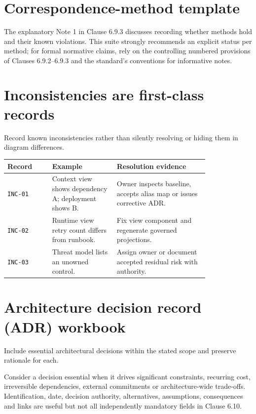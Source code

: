 \documentclass[11pt,letterpaper]{article}
\begin{document}
\section{Correspondence-method template}
\begin{Guidance}The explanatory Note 1 in Clause 6.9.3 discusses recording whether methods hold and their known violations. This suite strongly recommends an explicit status per method; for formal normative claims, rely on the controlling numbered provisions of Clauses 6.9.2--6.9.3 and the standard's conventions for informative notes.\end{Guidance}
\section{Inconsistencies are first-class records}
\begin{Requirement}\FlagReq{} Record known inconsistencies rather than silently resolving or hiding them in diagram differences. \end{Requirement}
\begin{longtable}{p{0.18\linewidth}p{0.26\linewidth}p{0.37\linewidth}}\toprule\textbf{Record}&\textbf{Example}&\textbf{Resolution evidence}\\\midrule\endhead
\texttt{INC-01}&Context view shows dependency A; deployment shows B.&Owner inspects baseline, accepts alias map or issues corrective ADR.\\
\texttt{INC-02}&Runtime view retry count differs from runbook.&Fix view component and regenerate governed projections.\\
\texttt{INC-03}&Threat model lists an unowned control.&Assign owner or document accepted residual risk with authority.\\\bottomrule\end{longtable}
\section{Architecture decision record (ADR) workbook}
\begin{Requirement}\FlagReq{} Include essential architectural decisions within the stated scope and preserve rationale for each. \end{Requirement}
\begin{Guidance}Consider a decision essential when it drives significant constraints, recurring cost, irreversible dependencies, external commitments or architecture-wide trade-offs. Identification, date, decision authority, alternatives, assumptions, consequences and links are useful but not all independently mandatory fields in Clause 6.10.\end{Guidance}
\end{document}
